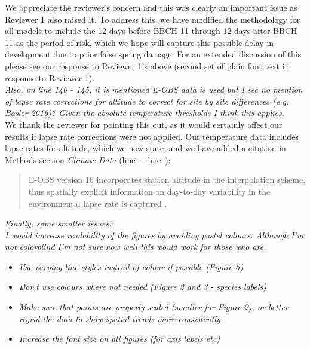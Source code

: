 \documentclass[11pt,a4paper]{article}\usepackage[]{graphicx}\usepackage[]{color}
\newcommand{\lr}[1]{line~\lineref{#1}}
\begin{document}
We appreciate the reviewer's concern and this was clearly an important issue as Reviewer 1 also raised it. To address this, we have modified the methodology for all models to include the 12 days before BBCH 11 through 12 days after BBCH 11 as the period of risk, which we hope will capture this possible delay in development due to prior false spring damage. For an extended discussion of this please see our response to Reviewer 1's above (second set of plain font text in response to Reviewer 1).\\

\textit{Also, on line 140 - 145, it is mentioned E-OBS data is used but I see no mention of lapse rate corrections for altitude to correct for site by site differences (e.g. Basler 2016)? Given the absolute temperature thresholds I think this applies.} \\

We thank the reviewer for pointing this out, as it would certainly affect our results if lapse rate corrections were not applied. Our temperature data includes lapse rates for altitude, which we now state, and we have added a citation in Methods section \textit{Climate Data} (\lr{R2clim} - \lr{R2climend}): \\

\begin{quotation}
\noindent  E-OBS version 16 incorporates station altitude in the interpolation scheme, thus spatially explicit information on day-to-day variability in the environmental lapse rate is captured \citep{Cornes2018}.
\end{quotation}


\textit{Finally, some smaller issues: }\\

\textit{I would increase readability of the figures by avoiding pastel colours. Although I'm not colorblind I'm not sure how well this would work for those who are. }\\

\begin{itemize}
\item \textit{Use varying line styles instead of colour if possible (Figure 5)}
\item  \textit{Don't use colours where not needed (Figure 2 and 3 - species labels)}
\item  \textit{Make sure that points are properly scaled (smaller for Figure 2), or better regrid the data to show spatial trends more consistently}
\item \textit{Increase the font size on all figures (for axis labels etc)}
\end{itemize}
\end{document}
